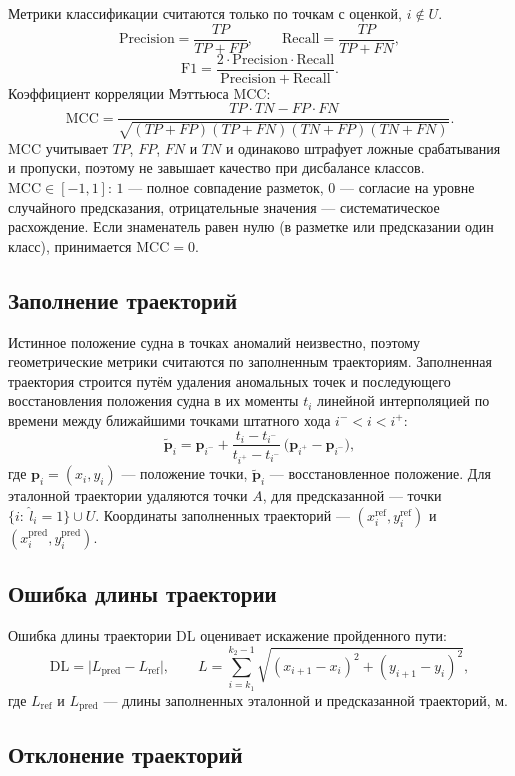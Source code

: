 \documentclass[a4paper,12pt]{report}
\begin{document}
	Метрики классификации считаются только по точкам с оценкой, $i\notin U$.
	\[
		\mathrm{Precision}=\frac{TP}{TP+FP},\qquad
		\mathrm{Recall}=\frac{TP}{TP+FN},
	\]
	\[
		\mathrm{F1}=\frac{2\cdot\mathrm{Precision}\cdot\mathrm{Recall}}{\mathrm{Precision}+\mathrm{Recall}}.
	\]
	Коэффициент корреляции Мэттьюса MCC:
	\[
		\mathrm{MCC}=\frac{TP\cdot TN-FP\cdot FN}{\sqrt{(TP+FP)(TP+FN)(TN+FP)(TN+FN)}}.
	\]
	MCC учитывает $TP$, $FP$, $FN$ и $TN$ и одинаково штрафует ложные срабатывания и пропуски, поэтому не завышает качество при дисбалансе классов.
	$\mathrm{MCC}\in[-1,1]$: $1$ --- полное совпадение разметок, $0$ --- согласие на уровне случайного предсказания, отрицательные значения --- систематическое расхождение.
	Если знаменатель равен нулю (в разметке или предсказании один класс), принимается $\mathrm{MCC}=0$.

	\subsection{Заполнение траекторий}

	Истинное положение судна в точках аномалий неизвестно, поэтому геометрические метрики считаются по заполненным траекториям.
	Заполненная траектория строится путём удаления аномальных точек и последующего восстановления положения судна в их моменты $t_i$ линейной интерполяцией по времени между ближайшими точками штатного хода $i^-<i<i^+$:
	\[
		\tilde{\mathbf p}_i=\mathbf p_{i^-}+\frac{t_i-t_{i^-}}{t_{i^+}-t_{i^-}}\,\bigl(\mathbf p_{i^+}-\mathbf p_{i^-}\bigr),
	\]
	где $\mathbf p_i=(x_i,y_i)$ --- положение точки, $\tilde{\mathbf p}_i$ --- восстановленное положение.
	Для эталонной траектории удаляются точки $A$, для предсказанной --- точки $\{i:\ \hat l_i=1\}\cup U$.
	Координаты заполненных траекторий --- $(x^{\mathrm{ref}}_i,y^{\mathrm{ref}}_i)$ и $(x^{\mathrm{pred}}_i,y^{\mathrm{pred}}_i)$.

	\subsection{Ошибка длины траектории}

	Ошибка длины траектории DL оценивает искажение пройденного пути:
	\[
		\mathrm{DL}=\bigl|L_{\mathrm{pred}}-L_{\mathrm{ref}}\bigr|,\qquad
		L=\sum_{i=k_1}^{k_2-1}\sqrt{(x_{i+1}-x_i)^2+(y_{i+1}-y_i)^2},
	\]
	где $L_{\mathrm{ref}}$ и $L_{\mathrm{pred}}$ --- длины заполненных эталонной и предсказанной траекторий, м.

	\subsection{Отклонение траекторий}
\end{document}

